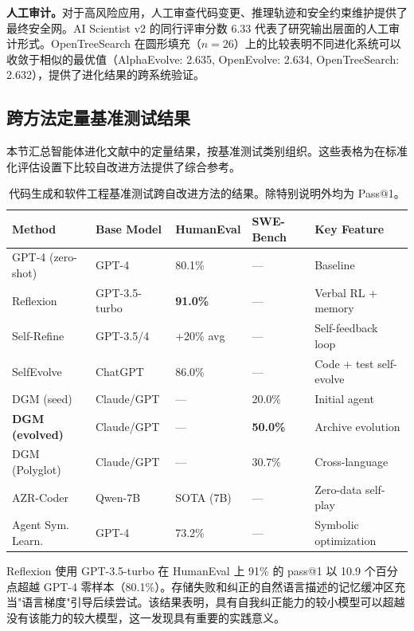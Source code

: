 \textbf{人工审计。}对于高风险应用，人工审查代码变更、推理轨迹和安全约束维护提供了最终安全网。AI Scientist v2 的同行评审分数 6.33 代表了研究输出层面的人工审计形式。OpenTreeSearch 在圆形填充（$n=26$）上的比较表明不同进化系统可以收敛于相似的最优值（AlphaEvolve: 2.635, OpenEvolve: 2.634, OpenTreeSearch: 2.632），提供了进化结果的跨系统验证。


\subsection{跨方法定量基准测试结果}
\label{sec:eval-quantitative}

本节汇总智能体进化文献中的定量结果，按基准测试类别组织。这些表格为在标准化评估设置下比较自改进方法提供了综合参考。

\begin{table}[htbp]
\centering
\small
\caption{代码生成和软件工程基准测试跨自改进方法的结果。除特别说明外均为 Pass@1。}
\label{tab:eval-code}
\begin{tabular}{p{28mm}p{22mm}p{18mm}p{18mm}p{30mm}}
\toprule
\textbf{Method} & \textbf{Base Model} & \textbf{HumanEval} & \textbf{SWE-Bench} & \textbf{Key Feature} \\
\midrule
GPT-4 (zero-shot) & GPT-4 & 80.1\% & --- & Baseline \\
Reflexion & GPT-3.5-turbo & \textbf{91.0\%} & --- & Verbal RL + memory \\
Self-Refine & GPT-3.5/4 & +20\% avg & --- & Self-feedback loop \\
SelfEvolve & ChatGPT & 86.0\% & --- & Code + test self-evolve \\
DGM (seed) & Claude/GPT & --- & 20.0\% & Initial agent \\
\textbf{DGM (evolved)} & Claude/GPT & --- & \textbf{50.0\%} & Archive evolution \\
DGM (Polyglot) & Claude/GPT & --- & 30.7\% & Cross-language \\
AZR-Coder & Qwen-7B & SOTA (7B) & --- & Zero-data self-play \\
Agent Sym. Learn. & GPT-4 & 73.2\% & --- & Symbolic optimization \\
\bottomrule
\end{tabular}
\end{table}

Reflexion 使用 GPT-3.5-turbo 在 HumanEval 上 91\% 的 pass@1 以 10.9 个百分点超越 GPT-4 零样本（80.1\%）。存储失败和纠正的自然语言描述的记忆缓冲区充当"语言梯度"引导后续尝试。该结果表明，具有自我纠正能力的较小模型可以超越没有该能力的较大模型，这一发现具有重要的实践意义。

